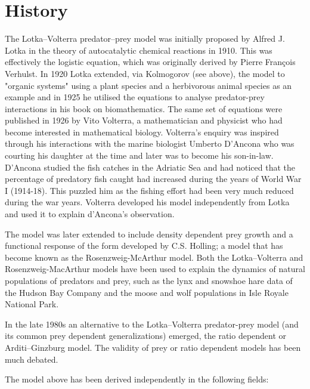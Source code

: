 \documentclass{article}
\begin{document}
\section{History}

The Lotka–Volterra predator–prey model was initially proposed by Alfred J. Lotka in the theory of autocatalytic chemical reactions in 1910.\cite{ref4}\cite{ref5} This was effectively the logistic equation,\cite{ref6} which was originally derived by Pierre François Verhulst.\cite{ref7} In 1920 Lotka extended, via Kolmogorov (see above), the model to "organic systems" using a plant species and a herbivorous animal species as an example and in 1925 he utilised the equations to analyse predator-prey interactions in his book on biomathematics. The same set of equations were published in 1926 by Vito Volterra, a mathematician and physicist who had become interested in mathematical biology.\cite{ref5} Volterra's enquiry was inspired through his interactions with the marine biologist Umberto D'Ancona who was courting his daughter at the time and later was to become his son-in-law. D'Ancona studied the fish catches in the Adriatic Sea and had noticed that the percentage of predatory fish caught had increased during the years of World War I (1914-18). This puzzled him as the fishing effort had been very much reduced during the war years. Volterra developed his model independently from Lotka and used it to explain d'Ancona's observation.

The model was later extended to include density dependent prey growth and a functional response of the form developed by C.S. Holling; a model that has become known as the Rosenzweig-McArthur model. Both the Lotka–Volterra and Rosenzweig-MacArthur models have been used to explain the dynamics of natural populations of predators and prey, such as the lynx and snowshoe hare data of the Hudson Bay Company and the moose and wolf populations in Isle Royale National Park.\cite{ref8}

In the late 1980s an alternative to the Lotka–Volterra predator-prey model (and its common prey dependent generalizations) emerged, the ratio dependent or Arditi–Ginzburg model. The validity of prey or ratio dependent models has been much debated.

The model above has been derived independently in the following fields:
\end{document}
